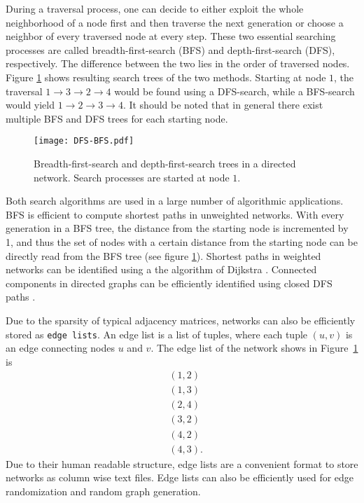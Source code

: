 During a traversal process, one can decide to either exploit the whole neighborhood of a node first and then traverse the next generation or choose a neighbor of every traversed node at every step.
These two essential searching processes are called breadth-first-search (BFS) and depth-first-search (DFS), respectively.
The difference between the two lies in the order of traversed nodes.
Figure \ref{fig:dfs_bfs} shows resulting search trees of the two methods.
Starting at node $1$, the traversal $1\rightarrow 3 \rightarrow 2 \rightarrow 4$ would be found using a DFS-search, while a BFS-search would yield $1\rightarrow 2 \rightarrow 3 \rightarrow 4$.
It should be noted that in general there exist multiple BFS and DFS trees for each starting node. 
%
\begin{figure}[htb]
\begin{center}
\texttt{[image: DFS-BFS.pdf]}
\caption{Breadth-first-search and depth-first-search trees in a directed network. Search processes are started at node $1$.}
\label{fig:dfs_bfs}
\end{center}
\end{figure}

Both search algorithms are used in a large number of algorithmic applications.
BFS is efficient to compute shortest paths in unweighted networks.
With every generation in a BFS tree, the distance from the starting node is incremented by 1, and thus the set of nodes with a certain distance from the starting node can be directly read from the BFS tree (see figure \ref{fig:dfs_bfs}).
Shortest paths in weighted networks can be identified using a the algorithm of Dijkstra \citep{Dijkstra:1959}.
Connected components in directed graphs can be efficiently identified using closed DFS paths \citep{algorithm_design}.

Due to the sparsity of typical adjacency matrices, networks can also be efficiently stored as \verb"edge lists".
An edge list is a list of tuples, where each tuple $(u,v)$ is an edge connecting nodes $u$ and $v$.
The edge list of the network shows in Figure~\ref{fig:dfs_bfs} is
\begin{align*}
&(1,2)\\
&(1,3)\\
&(2,4)\\
&(3,2)\\
&(4,2)\\
&(4,3) .
\end{align*}
Due to their human readable structure, edge lists are a convenient format to store networks as column wise text files.
Edge lists can also be efficiently used for edge randomization and random graph generation.

